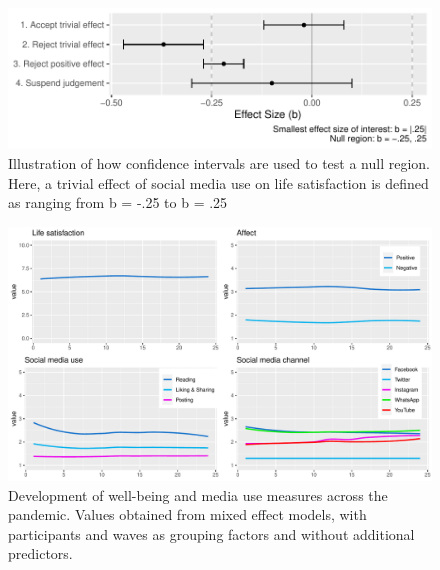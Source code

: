 \documentclass[
  man,mask]{apa6}
\begin{document}
\newpage

\begin{figure}
\centering
\includegraphics{manuscript_files/figure-latex/sesoi-1.pdf}
\caption{\label{fig:sesoi}Illustration of how confidence intervals are used to test a null region. Here, a trivial effect of social media use on life satisfaction is defined as ranging from b = -.25 to b = .25}
\end{figure}

\newpage

\begin{figure}
\includegraphics[width=\textwidth]{figures/fig_descriptives} \caption{Development of well-being and media use measures across the pandemic. Values obtained from mixed effect models, with participants and waves as grouping factors and without additional predictors.}\label{fig:descriptives}
\end{figure}

\newpage
\end{document}
